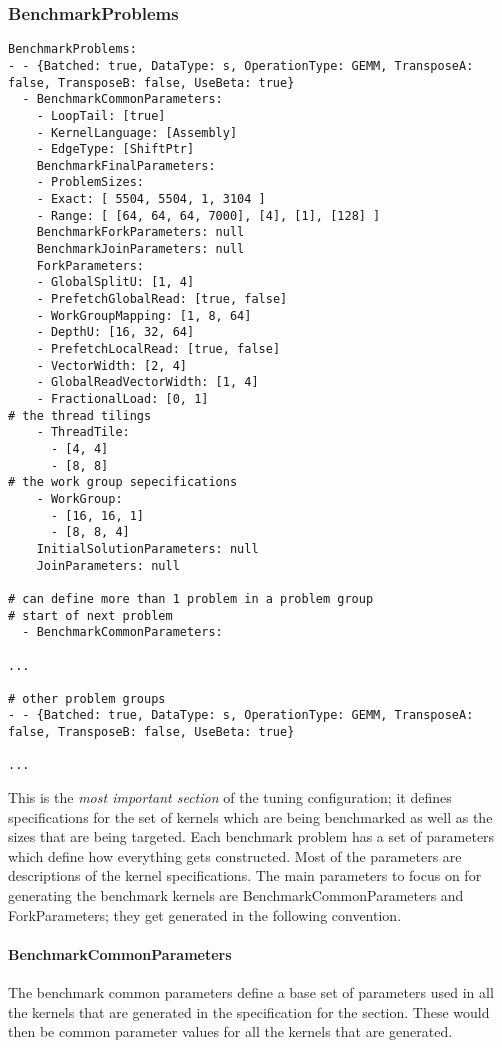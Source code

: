 \documentclass[]{article}
\begin{document}
\subsubsection{BenchmarkProblems}
\begin{verbatim}
BenchmarkProblems:
- - {Batched: true, DataType: s, OperationType: GEMM, TransposeA: false, TransposeB: false, UseBeta: true}
  - BenchmarkCommonParameters:
    - LoopTail: [true]
    - KernelLanguage: [Assembly]
    - EdgeType: [ShiftPtr]
    BenchmarkFinalParameters:
    - ProblemSizes:
    - Exact: [ 5504, 5504, 1, 3104 ]
    - Range: [ [64, 64, 64, 7000], [4], [1], [128] ]
    BenchmarkForkParameters: null
    BenchmarkJoinParameters: null
    ForkParameters:
    - GlobalSplitU: [1, 4]
    - PrefetchGlobalRead: [true, false]
    - WorkGroupMapping: [1, 8, 64]
    - DepthU: [16, 32, 64]
    - PrefetchLocalRead: [true, false]
    - VectorWidth: [2, 4]
    - GlobalReadVectorWidth: [1, 4]
    - FractionalLoad: [0, 1]
# the thread tilings
    - ThreadTile:
      - [4, 4]
      - [8, 8]
# the work group sepecifications
    - WorkGroup:
      - [16, 16, 1]
      - [8, 8, 4]
    InitialSolutionParameters: null
    JoinParameters: null

# can define more than 1 problem in a problem group
# start of next problem
  - BenchmarkCommonParameters:

...

# other problem groups
- - {Batched: true, DataType: s, OperationType: GEMM, TransposeA: false, TransposeB: false, UseBeta: true}

...

\end{verbatim}

This is the \textit{most important section} of the tuning configuration; it defines specifications for the set of kernels which are being benchmarked as well as the sizes that are being targeted. Each benchmark problem has a set of parameters which define how everything gets constructed. Most of the parameters are descriptions of the kernel specifications. The main parameters to focus on for generating the benchmark kernels are BenchmarkCommonParameters and ForkParameters; they get generated in the following convention.

\paragraph{BenchmarkCommonParameters} The benchmark common parameters define a base set of parameters used in all the kernels that are generated in the specification for the section. These would then be common parameter values for all the kernels that are generated.
\end{document}
